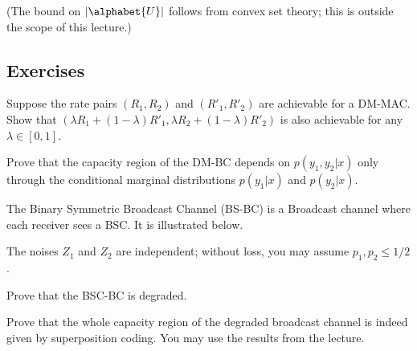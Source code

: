 \documentclass[a4paper, 11pt, openany]{book}
\begin{document}
(The bound on $|\alphabet{U}|$ follows from convex set theory; this is outside the scope of this lecture.)


\subsection{Exercises}



\begin{exercise}
Suppose the rate pairs $(R_1,R_2)$ and $(R'_1,R'_2)$ are achievable for a DM-MAC. Show that $(\lambda R_1 + (1- \lambda)R'_1, \lambda R_2 + (1- \lambda)R'_2)$ is also achievable for any $\lambda \in [0,1]$.
\end{exercise}



\begin{exercise}
Prove that the capacity region of the DM-BC depends on $p(y_1, y_2|x)$ only through the conditional marginal distributions $p(y_1|x)$ and $p(y_2|x)$.
\end{exercise}




\begin{exercise}
The Binary Symmetric Broadcast Channel (BS-BC) is a Broadcast channel where each receiver sees a BSC. It is illustrated below.

\begin{center}
\end{center}

The noises $Z_1$ and $Z_2$ are independent; without loss, you may assume $p_1, p_2 \le 1/2$.

Prove that the BSC-BC is degraded.
\end{exercise}



\begin{exercise}
Prove that the whole capacity region of the degraded broadcast channel is indeed given by  superposition coding. You may use the results from the lecture.
\end{exercise}
\end{document}
